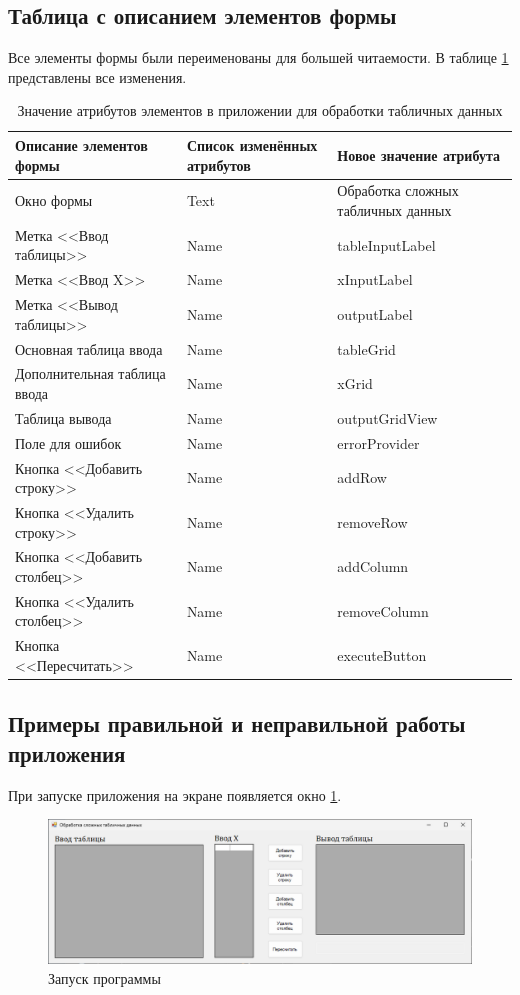 \subsection{Таблица с описанием элементов формы}
Все элементы формы были переименованы для большей читаемости. В таблице \ref{tab:handling-data-hard-form} представлены все изменения.

\begin{table}
\centering
\begin{tabular}{|m{}|m{}|m{}|}
\hline
\textbf{Описание элементов формы} & \textbf{Список изменённых атрибутов} & \textbf{Новое значение атрибута} \\
\hline
\hline
Окно формы & Text & Обработка сложных табличных данных \\
Метка <<Ввод таблицы>> & Name & tableInputLabel \\
Метка <<Ввод X>> & Name & xInputLabel \\
Метка <<Вывод таблицы>> & Name & outputLabel \\
Основная таблица ввода & Name & tableGrid \\
Дополнительная таблица ввода & Name & xGrid \\
Таблица вывода & Name & outputGridView \\
Поле для ошибок & Name & errorProvider \\
Кнопка <<Добавить строку>> & Name & addRow \\
Кнопка <<Удалить строку>> & Name & removeRow \\
Кнопка <<Добавить столбец>> & Name & addColumn \\
Кнопка <<Удалить столбец>> & Name & removeColumn \\
Кнопка <<Пересчитать>> & Name & executeButton \\

\hline
\end{tabular}
\caption{Значение атрибутов элементов в приложении для обработки табличных данных}
\label{tab:handling-data-hard-form}
\end{table}

\subsection{Примеры правильной и неправильной работы приложения}
При запуске приложения на экране появляется окно \ref{fig:handling-data-hard-start}.

\begin{figure}
\centering
\includegraphics[width=0.5\linewidth]{images//handling-data-hard/start.png}
\caption{Запуск программы}
\label{fig:handling-data-hard-start}
\end{figure}

